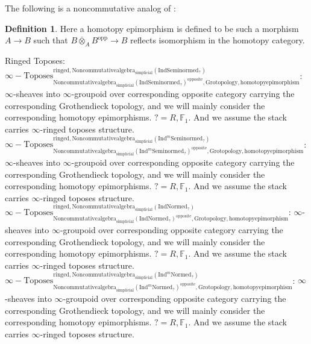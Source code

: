 \documentclass[11pt]{book}
\theoremstyle{definition}
\newtheorem{definition}[theorem]{Definition}
\numberwithin{equation}{section}
\begin{document}
\indent The following is a noncommutative analog of \cite[Definition 5.6]{12BBBK}:

\begin{definition}
Here a homotopy epimorphism is defined to be such a morphism $A\rightarrow B$ such that $B\overline{\otimes}_A B^\mathrm{opp}\rightarrow B$ reflects isomorphism in the homotopy category.
\end{definition}

 
 
\noindent Ringed Toposes: \\
 
 \noindent $\infty-\mathrm{Toposes}^{\mathrm{ringed},\mathrm{Noncommutativealgebra}_{\mathrm{simplicial}}(\mathrm{Ind}\mathrm{Seminormed}_?)}_{\mathrm{Noncommutativealgebra}_{\mathrm{simplicial}}(\mathrm{Ind}\mathrm{Seminormed}_?)^\mathrm{opposite},\mathrm{Grotopology,homotopyepimorphism}}$: $\infty$-sheaves into $\infty$-groupoid over corresponding opposite category carrying the corresponding Grothendieck topology, and we will mainly consider the corresponding homotopy epimorphisms. $?=R,\mathbb{F}_1$. And we assume the stack carries $\infty$-ringed toposes structure. \\
\noindent $\infty-\mathrm{Toposes}^{\mathrm{ringed},\mathrm{Noncommutativealgebra}_{\mathrm{simplicial}}(\mathrm{Ind}^m\mathrm{Seminormed}_?)}_{\mathrm{Noncommutativealgebra}_{\mathrm{simplicial}}(\mathrm{Ind}^m\mathrm{Seminormed}_?)^\mathrm{opposite},\mathrm{Grotopology,homotopyepimorphism}}$: $\infty$-sheaves into $\infty$-groupoid over corresponding opposite category carrying the corresponding Grothendieck topology, and we will mainly consider the corresponding homotopy epimorphisms. $?=R,\mathbb{F}_1$. And we assume the stack carries $\infty$-ringed toposes structure.\\
\noindent $\infty-\mathrm{Toposes}^{\mathrm{ringed},\mathrm{Noncommutativealgebra}_{\mathrm{simplicial}}(\mathrm{Ind}\mathrm{Normed}_?)}_{\mathrm{Noncommutativealgebra}_{\mathrm{simplicial}}(\mathrm{Ind}\mathrm{Normed}_?)^\mathrm{opposite},\mathrm{Grotopology,homotopyepimorphism}}$: $\infty$-sheaves into $\infty$-groupoid over corresponding opposite category carrying the corresponding Grothendieck topology, and we will mainly consider the corresponding homotopy epimorphisms. $?=R,\mathbb{F}_1$. And we assume the stack carries $\infty$-ringed toposes structure.\\
\noindent $\infty-\mathrm{Toposes}^{\mathrm{ringed},\mathrm{Noncommutativealgebra}_{\mathrm{simplicial}}(\mathrm{Ind}^m\mathrm{Normed}_?)}_{\mathrm{Noncommutativealgebra}_{\mathrm{simplicial}}(\mathrm{Ind}^m\mathrm{Normed}_?)^\mathrm{opposite},\mathrm{Grotopology,homotopyepimorphism}}$: $\infty$-sheaves into $\infty$-groupoid over corresponding opposite category carrying the corresponding Grothendieck topology, and we will mainly consider the corresponding homotopy epimorphisms. $?=R,\mathbb{F}_1$. And we assume the stack carries $\infty$-ringed toposes structure.\\
\end{document}
